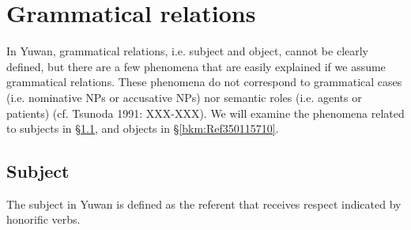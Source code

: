 \chapter{Grammatical relations}\label{chap:3}\hypertarget{RefHeadingToc395696987}{}
In Yuwan, grammatical relations, i.e. subject and object, cannot be clearly defined, but there are a few phenomena that are easily explained if we assume grammatical relations. These phenomena do not correspond to grammatical cases (i.e. nominative NPs or accusative NPs) nor semantic roles (i.e. agents or patients) (cf. Tsunoda 1991: XXX-XXX). We will examine the phenomena related to subjects in §\ref{bkm:Ref350115473}, and objects in §\ref{bkm:Ref350115710}.

\section{Subject}
\label{bkm:Ref350115473}\hypertarget{RefHeadingToc395696988}{}
The subject in Yuwan is defined as the referent that receives respect indicated by honorific verbs.

